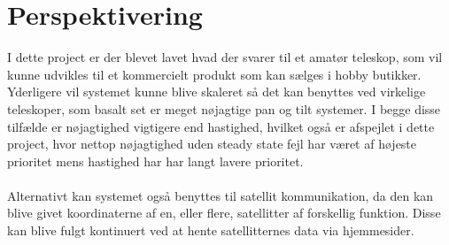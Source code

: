 \section{Perspektivering}

I dette project er der blevet lavet hvad der svarer til et amatør teleskop, som vil kunne udvikles til et kommercielt produkt som kan sælges i hobby butikker. Yderligere vil systemet kunne blive skaleret så det kan benyttes ved virkelige teleskoper, som basalt set er meget nøjagtige pan og tilt systemer. I begge disse tilfælde er nøjagtighed vigtigere end hastighed, hvilket også er afspejlet i dette project, hvor nettop nøjagtighed uden steady state fejl har været af højeste prioritet mens hastighed har har langt lavere prioritet.
\\
\\
Alternativt kan systemet også benyttes til satellit kommunikation, da den kan blive givet koordinaterne af en, eller flere, satellitter af forskellig funktion. Disse kan blive fulgt kontinuert ved at hente satellitternes data via hjemmesider.